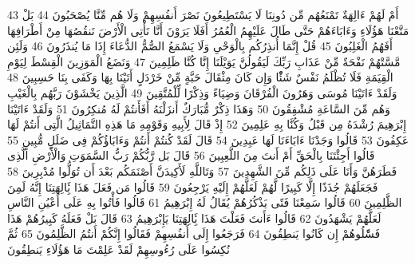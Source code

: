 \documentclass[20pt,a4paper]{article}
\begin{document}
{\tiny\colorbox{cl_aya}{43}} أَمْ لَهُمْ ءَالِهَةٌ تَمْنَعُهُم مِّن دُونِنَا لَا يَسْتَطِيعُونَ نَصْرَ أَنفُسِهِمْ وَلَا هُم مِّنَّا يُصْحَبُونَ
{\tiny\colorbox{cl_aya}{44}} بَلْ مَتَّعْنَا هَؤُلَاءِ وَءَابَاءَهُمْ حَتَّى طَالَ عَلَيْهِمُ الْعُمُرُ أَفَلَا يَرَوْنَ أَنَّا نَأْتِى الْأَرْضَ نَنقُصُهَا مِنْ أَطْرَافِهَا أَفَهُمُ الْغَلِبُونَ
{\tiny\colorbox{cl_aya}{45}} قُلْ إِنَّمَا أُنذِرُكُم بِالْوَحْىِ وَلَا يَسْمَعُ الصُّمُّ الدُّعَاءَ إِذَا مَا يُنذَرُونَ
{\tiny\colorbox{cl_aya}{46}} وَلَئِن مَّسَّتْهُمْ نَفْحَةٌ مِّنْ عَذَابِ رَبِّكَ لَيَقُولُنَّ يَوَيْلَنَا إِنَّا كُنَّا ظَلِمِينَ
{\tiny\colorbox{cl_aya}{47}} وَنَضَعُ الْمَوَزِينَ الْقِسْطَ لِيَوْمِ الْقِيَمَةِ فَلَا تُظْلَمُ نَفْسٌ شَئًْا وَإِن كَانَ مِثْقَالَ حَبَّةٍ مِّنْ خَرْدَلٍ أَتَيْنَا بِهَا وَكَفَى بِنَا حَسِبِينَ
{\tiny\colorbox{cl_aya}{48}} وَلَقَدْ ءَاتَيْنَا مُوسَى وَهَرُونَ الْفُرْقَانَ وَضِيَاءً وَذِكْرًا لِّلْمُتَّقِينَ
{\tiny\colorbox{cl_aya}{49}} الَّذِينَ يَخْشَوْنَ رَبَّهُم بِالْغَيْبِ وَهُم مِّنَ السَّاعَةِ مُشْفِقُونَ
{\tiny\colorbox{cl_aya}{50}} وَهَذَا ذِكْرٌ مُّبَارَكٌ أَنزَلْنَهُ أَفَأَنتُمْ لَهُ مُنكِرُونَ
{\tiny\colorbox{cl_aya}{51}} وَلَقَدْ ءَاتَيْنَا إِبْرَهِيمَ رُشْدَهُ مِن قَبْلُ وَكُنَّا بِهِ عَلِمِينَ
{\tiny\colorbox{cl_aya}{52}} إِذْ قَالَ لِأَبِيهِ وَقَوْمِهِ مَا هَذِهِ التَّمَاثِيلُ الَّتِى أَنتُمْ لَهَا عَكِفُونَ
{\tiny\colorbox{cl_aya}{53}} قَالُوا وَجَدْنَا ءَابَاءَنَا لَهَا عَبِدِينَ
{\tiny\colorbox{cl_aya}{54}} قَالَ لَقَدْ كُنتُمْ أَنتُمْ وَءَابَاؤُكُمْ فِى ضَلَلٍ مُّبِينٍ
{\tiny\colorbox{cl_aya}{55}} قَالُوا أَجِئْتَنَا بِالْحَقِّ أَمْ أَنتَ مِنَ اللَّعِبِينَ
{\tiny\colorbox{cl_aya}{56}} قَالَ بَل رَّبُّكُمْ رَبُّ السَّمَوَتِ وَالْأَرْضِ الَّذِى فَطَرَهُنَّ وَأَنَا عَلَى ذَلِكُم مِّنَ الشَّهِدِينَ
{\tiny\colorbox{cl_aya}{57}} وَتَاللَّهِ لَأَكِيدَنَّ أَصْنَمَكُم بَعْدَ أَن تُوَلُّوا مُدْبِرِينَ
{\tiny\colorbox{cl_aya}{58}} فَجَعَلَهُمْ جُذَذًا إِلَّا كَبِيرًا لَّهُمْ لَعَلَّهُمْ إِلَيْهِ يَرْجِعُونَ
{\tiny\colorbox{cl_aya}{59}} قَالُوا مَن فَعَلَ هَذَا بَِٔالِهَتِنَا إِنَّهُ لَمِنَ الظَّلِمِينَ
{\tiny\colorbox{cl_aya}{60}} قَالُوا سَمِعْنَا فَتًى يَذْكُرُهُمْ يُقَالُ لَهُ إِبْرَهِيمُ
{\tiny\colorbox{cl_aya}{61}} قَالُوا فَأْتُوا بِهِ عَلَى أَعْيُنِ النَّاسِ لَعَلَّهُمْ يَشْهَدُونَ
{\tiny\colorbox{cl_aya}{62}} قَالُوا ءَأَنتَ فَعَلْتَ هَذَا بَِٔالِهَتِنَا يَإِبْرَهِيمُ
{\tiny\colorbox{cl_aya}{63}} قَالَ بَلْ فَعَلَهُ كَبِيرُهُمْ هَذَا فَسَْٔلُوهُمْ إِن كَانُوا يَنطِقُونَ
{\tiny\colorbox{cl_aya}{64}} فَرَجَعُوا إِلَى أَنفُسِهِمْ فَقَالُوا إِنَّكُمْ أَنتُمُ الظَّلِمُونَ
{\tiny\colorbox{cl_aya}{65}} ثُمَّ نُكِسُوا عَلَى رُءُوسِهِمْ لَقَدْ عَلِمْتَ مَا هَؤُلَاءِ يَنطِقُونَ
\end{document}
